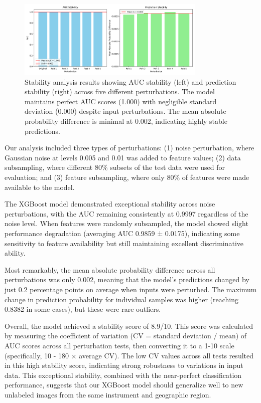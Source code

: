 \documentclass[10pt,letterpaper]{article}
\begin{document}
\begin{figure}[h]
\centering
\includegraphics[width=0.8\textwidth]{xgboost_stability_raw_autoencoder_extra.png}
\caption{Stability analysis results showing AUC stability (left) and prediction stability (right) across five different perturbations. The model maintains perfect AUC scores (1.000) with negligible standard deviation (0.000) despite input perturbations. The mean absolute probability difference is minimal at 0.002, indicating highly stable predictions.}
\label{fig:stability}
\end{figure}

Our analysis included three types of perturbations: (1) noise perturbation, where Gaussian noise at levels 0.005 and 0.01 was added to feature values; (2) data subsampling, where different 80\% subsets of the test data were used for evaluation; and (3) feature subsampling, where only 80\% of features were made available to the model.

The XGBoost model demonstrated exceptional stability across noise perturbations, with the AUC remaining consistently at 0.9997 regardless of the noise level. When features were randomly subsampled, the model showed slight performance degradation (averaging AUC 0.9859 ± 0.0175), indicating some sensitivity to feature availability but still maintaining excellent discriminative ability.

Most remarkably, the mean absolute probability difference across all perturbations was only 0.002, meaning that the model's predictions changed by just 0.2 percentage points on average when inputs were perturbed. The maximum change in prediction probability for individual samples was higher (reaching 0.8382 in some cases), but these were rare outliers.

Overall, the model achieved a stability score of 8.9/10. This score was calculated by measuring the coefficient of variation (CV = standard deviation / mean) of AUC scores across all perturbation tests, then converting it to a 1-10 scale (specifically, 10 - 180 × average CV). The low CV values across all tests resulted in this high stability score, indicating strong robustness to variations in input data. This exceptional stability, combined with the near-perfect classification performance, suggests that our XGBoost model should generalize well to new unlabeled images from the same instrument and geographic region.
\end{document}
